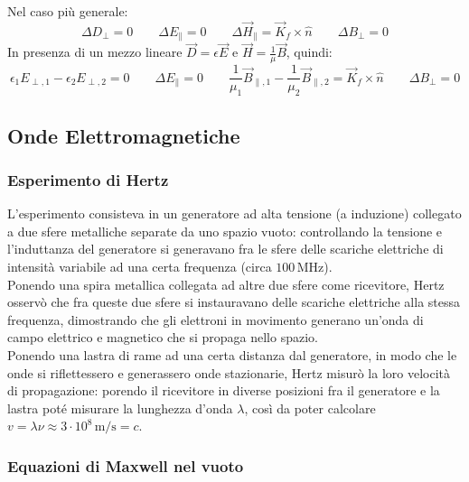 Nel caso più generale:
\begin{equation}
	\Delta D_{\perp} = 0 \qquad \Delta E_{\parallel} = 0 \qquad \Delta\vec{H}_{\parallel} = \vec{K}_f \times \hat{n} \qquad \Delta B_{\perp} = 0 
	\label{eq:7}
\end{equation}
In presenza di un mezzo lineare $ \vec{D} = \epsilon\vec{E} $ e $ \vec{H} = \frac{1}{\mu}\vec{B} $, quindi:
\begin{equation}
	\epsilon_1 E_{\perp,1} - \epsilon_2 E_{\perp,2} = 0 \qquad \Delta E_{\parallel} = 0 \qquad \frac{1}{\mu_1}\vec{B}_{\parallel,1} - \frac{1}{\mu_2}\vec{B}_{\parallel,2} = \vec{K}_f \times \hat{n} \qquad \Delta B_{\perp} = 0 
	\label{eq:8}
\end{equation}

\subsection{Onde Elettromagnetiche}

\subsubsection{Esperimento di Hertz}

L'esperimento consisteva in un generatore ad alta tensione (a induzione) collegato a due sfere metalliche separate da uno spazio vuoto: controllando la tensione e l'induttanza del generatore si generavano fra le sfere delle scariche elettriche di intensità variabile ad una certa frequenza (circa $ 100\,\text{MHz} $). \\ 
%
Ponendo una spira metallica collegata ad altre due sfere come ricevitore, Hertz osservò che fra queste due sfere si instauravano delle scariche elettriche alla stessa frequenza, dimostrando che gli elettroni in movimento generano un'onda di campo elettrico e magnetico che si propaga nello spazio. \\ 
%
Ponendo una lastra di rame ad una certa distanza dal generatore, in modo che le onde si riflettessero e generassero onde stazionarie, Hertz misurò la loro velocità di propagazione: porendo il ricevitore in diverse posizioni fra il generatore e la lastra poté misurare la lunghezza d'onda $ \lambda $, così da poter calcolare $ v = \lambda\nu \approx 3\cdot 10^8 \,\text{m/s} = c $.

\subsubsection{Equazioni di Maxwell nel vuoto}

